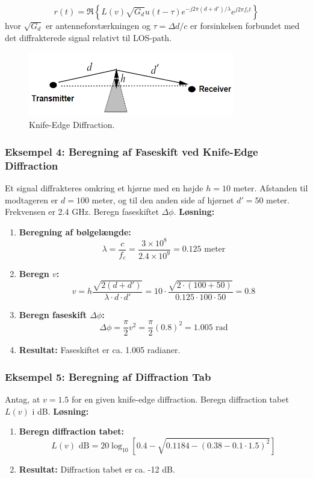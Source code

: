 \documentclass[a4paper,12pt]{book}
\begin{document}
	\[
	r(t) = \Re \left\{ L(v) \sqrt{G_d} u(t - \tau) e^{-j2\pi(d+d')/\lambda} e^{j2\pi f_c t} \right\}
	\]
	\noindent hvor \( \sqrt{G_d} \) er antenneforstærkningen og \( \tau = \Delta d / c \) er forsinkelsen forbundet med det diffrakterede signal relativt til LOS-path.
	\begin{figure}[h]
		\centering
		\includegraphics[width=0.8\textwidth]{fig/fig7.png}
		\caption{Knife-Edge Diffraction.}
		\label{fig:knife_edge_diffraction}
	\end{figure}
	\subsubsection{Eksempel 4: Beregning af Faseskift ved Knife-Edge Diffraction}
	\noindent Et signal diffrakteres omkring et hjørne med en højde \( h = 10 \) meter. Afstanden til modtageren er \( d = 100 \) meter, og til den anden side af hjørnet \( d' = 50 \) meter. Frekvensen er 2.4 GHz. Beregn faseskiftet \( \Delta \phi \).
	\newline\newline
	\noindent \textbf{Løsning:}
	\begin{enumerate}
		\item \textbf{Beregning af bølgelængde:} 
		\[
		\lambda = \frac{c}{f_c} = \frac{3 \times 10^8}{2.4 \times 10^9} = 0.125 \text{ meter}
		\]
		\item \textbf{Beregn \( v \):}
		\[
		v = h \frac{\sqrt{2(d+d')}}{\lambda \cdot d \cdot d'} = 10 \cdot \frac{\sqrt{2 \cdot (100 + 50)}}{0.125 \cdot 100 \cdot 50} = 0.8
		\]
		\item \textbf{Beregn faseskift \( \Delta \phi \):}
		\[
		\Delta \phi = \frac{\pi}{2}v^2 = \frac{\pi}{2}(0.8)^2 = 1.005 \text{ rad}
		\]
		\item \textbf{Resultat:} Faseskiftet er ca. 1.005 radianer.
	\end{enumerate}
	
	\subsubsection{Eksempel 5: Beregning af Diffraction Tab}
	\noindent Antag, at \( v = 1.5 \) for en given knife-edge diffraction. Beregn diffraction tabet \( L(v) \) i dB.
	\newline\newline
	\noindent \textbf{Løsning:}
	\begin{enumerate}
		\item \textbf{Beregn diffraction tabet:}
		\[
		L(v) \text{ dB} = 20 \log_{10}[0.4 - \sqrt{0.1184 - (0.38 - 0.1 \cdot 1.5)^2}]
		\]
		\item \textbf{Resultat:} Diffraction tabet er ca. -12 dB.
	\end{enumerate}
	
\end{document}
